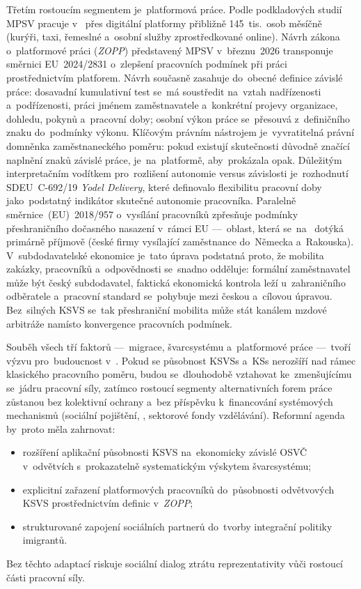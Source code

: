 Třetím rostoucím segmentem je~platformová práce. Podle podkladových
studií \acs{MPSV} pracuje v~ přes digitální platformy přibližně
145~tis.\ osob měsíčně (kurýři, taxi, řemeslné a~osobní služby
zprostředkované online). Návrh zákona o~platformové práci (\emph{ZOPP})
představený \acs{MPSV} v~březnu~2026 transponuje směrnici \acs{EU}~2024/2831
o~zlepšení pracovních podmínek při práci prostřednictvím
platforem.
Návrh současně zasahuje do~obecné definice závislé práce: dosavadní kumulativní test se~má soustředit na~vztah nadřízenosti a~podřízenosti, práci jménem zaměstnavatele a~konkrétní projevy organizace, dohledu, pokynů a~pracovní doby; osobní výkon práce se~přesouvá z~definičního znaku do~podmínky výkonu.
Klíčovým právním nástrojem je~vyvratitelná právní domněnka
zaměstnaneckého poměru: pokud existují skutečnosti důvodně značící naplnění
znaků závislé práce, je~na~platformě, aby~prokázala opak. Důležitým
interpretačním vodítkem pro~rozlišení autonomie versus závislosti je~rozhodnutí
\acf{SDEU}~C-692/19 \emph{Yodel Delivery}, které definovalo flexibilitu pracovní
doby jako~podstatný indikátor skutečné autonomie pracovníka.
Paralelně směrnice~(\acs{EU})~2018/957 o~vysílání pracovníků zpřesňuje
podmínky přeshraničního dočasného nasazení v~rámci \acs{EU} ---~oblast,
která se~na~ dotýká primárně příjmově (české firmy vysílající
zaměstnance do~Německa a~Rakouska). V~subdodavatelské ekonomice je~tato úprava podstatná proto, že mobilita zakázky, pracovníků a~odpovědnosti se~snadno odděluje: formální zaměstnavatel může být český subdodavatel, faktická ekonomická kontrola leží u~zahraničního odběratele a~pracovní standard se~pohybuje mezi českou a~cílovou úpravou. Bez~silných \acs{KSVS} se~tak přeshraniční mobilita může stát kanálem mzdové arbitráže namísto konvergence pracovních podmínek.~\cite{MPSV_ZakonOdmenovani_2026}~\cite{Kabat_ZOPP_2026}~\cite{smernice_posted_workers_2018_957}\par

Souběh všech tří faktorů ---~migrace, švarcsystému a~platformové práce
---~tvoří výzvu pro~budoucnost  v~. Pokud se působnost
\acp{KSVS} a~\acp{KS} nerozšíří nad rámec klasického pracovního poměru,
budou se~dlouhodobě vztahovat ke~zmenšujícímu se~jádru pracovní síly,
zatímco rostoucí segmenty alternativních forem práce zůstanou bez kolektivní ochrany
a~bez příspěvku k~financování systémových mechanismů (sociální pojištění, ,
sektorové fondy vzdělávání). Reformní agenda by~proto měla zahrnovat:
\begin{itemize}
  \item rozšíření aplikační působnosti \acs{KSVS} na~ekonomicky závislé \acs{OSVČ} v~odvětvích s~prokazatelně systematickým výskytem švarcsystému;
  \item explicitní zařazení platformových pracovníků do~působnosti odvětvových \acs{KSVS} prostřednictvím definic v~\emph{ZOPP};
  \item strukturované zapojení sociálních partnerů do~tvorby integrační politiky imigrantů.
\end{itemize}
Bez těchto adaptací riskuje sociální dialog ztrátu reprezentativity vůči rostoucí
části pracovní síly.\par
